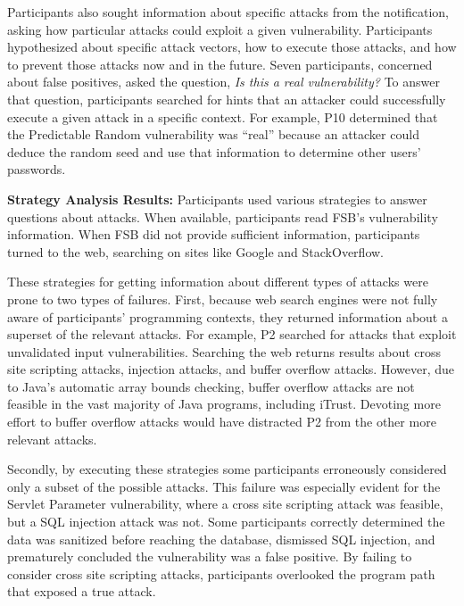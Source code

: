 \documentclass[10pt,journal,compsoc]{IEEEtran}
\begin{document}
Participants also sought information about specific attacks from the notification, asking how particular attacks could exploit a given vulnerability.
Participants hypothesized about specific attack vectors, how to execute those attacks, and how to prevent those attacks now and in the future.
Seven participants, concerned about false positives, asked the question, \textit{Is this a real vulnerability?} 
To answer that question, participants searched for hints that an attacker could successfully execute a given attack in a specific context. 
For example, P10 determined that the Predictable Random vulnerability was ``real'' because an attacker could deduce the random seed and use that information to determine other users' passwords. 

\textbf{Strategy Analysis Results:}
Participants used various strategies to answer questions about attacks.
When available, participants read FSB's vulnerability information. 
When FSB did not provide sufficient information, participants turned to the web, searching on sites like Google and StackOverflow. 

These strategies for getting information about different types of attacks were prone to two types of failures. 
First, because web search engines were not fully aware of participants' programming contexts, they returned information about a superset of the relevant attacks.
For example, P2 searched for attacks that exploit unvalidated input vulnerabilities.
Searching the web returns results about cross site scripting attacks, injection attacks, and buffer overflow attacks. 
However, due to Java's automatic array bounds checking, buffer overflow attacks are not feasible in the vast majority of Java programs, including iTrust.
Devoting more effort to buffer overflow attacks would have distracted P2 from the other more relevant attacks. 


Secondly, by executing these strategies some participants erroneously considered only a subset of the possible attacks. 
This failure was especially evident for the Servlet Parameter vulnerability, where a cross site scripting attack was feasible, but a SQL injection attack was not. 
Some participants correctly determined the data was sanitized before reaching the database, dismissed SQL injection, and prematurely concluded the vulnerability was a false positive.
By failing to consider cross site scripting attacks, participants overlooked the program path that exposed a true attack.
\end{document}
